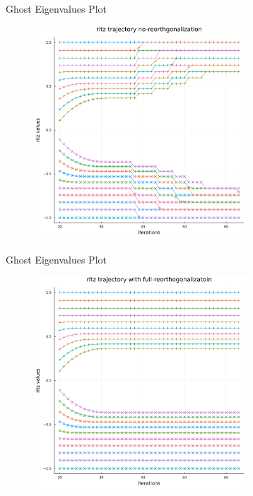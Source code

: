 \documentclass{beamer}
\begin{document}
    \begin{frame}{Ghost Eigenvalues Plot}
        \begin{figure}[H]
            \centering
            \includegraphics[width=8cm]{ritz_trajectory_plot_floats.png}
        \end{figure}
    \end{frame}
    \begin{frame}{Ghost Eigenvalues Plot}
        \begin{figure}
            \centering
            \includegraphics[width=8cm]{ritz_trajectory_plot_exact.png}
        \end{figure}
    \end{frame}
\end{document}
